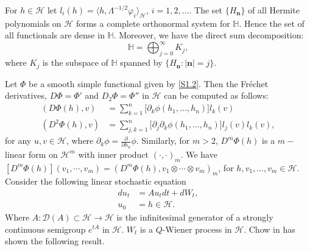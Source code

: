 \documentclass[review, onefignum, onetabnum]{siamart171218}
\begin{document}
\begin{lemma}\label{s1.le1}
     For $h\in\mathcal{H}  $ let $l_i(h)=\langle h,  \Lambda^{-1/2}\varphi_i
    \rangle_\mathcal{H}$, $ i=1,2,\ldots$. The set $\{H_{\bm{n}}\}$ of all
    Hermite polynomials on $\mathcal{H} $ forms a complete orthonormal system
    for $\mathbb{H} $. Hence the set of all functionals are dense in
    $\mathbb{H}$. Moreover, we have the direct sum decomposition:
     \[
        \mathbb{H} = \bigoplus_{j=0}^\infty K_j,
    \]
    where $K_j$ is the subspace of $\mathbb{H} $ spanned by $\{H_{\bm{n}}:
    |\bm{n}|=j\}$.

\end{lemma}
%
Let $\Phi$ be a smooth simple functional given by \eqref{S1.2}. Then the
Fr\'echet derivatives, $D \Phi = \Phi'$ and $D_2 \Phi = \Phi''$ in
$\mathcal{H}$ can be computed as follows:
\begin{equation}
    \label{s1.3}
    \begin{aligned}
        (D \Phi(h), v)
        &=
            \sum_{k=1}^n \big[\partial_k \phi(h_1,\ldots,h_n)\big]
            l_k(v)\nonumber
        \\
        (D^2 \Phi(h), v)
        &=
            \sum_{j,k=1}^n \big[\partial_j\partial_k
            \phi(h_1,\ldots,h_n)\big] l_j(v) l_k(v),
    \end{aligned}
\end{equation}
for any $u, v \in \mathcal{H}$, where
$\partial_k \phi= \frac{\partial}{\partial h_k} \phi$.
Similarly, for $m > 2$, $D^m \Phi(h)$ is a $m-$linear form on $\mathcal{H}^m$
with inner product $(\cdot,\cdot)_m$.
We have
$
%
    [D^m\Phi(h) ](v_1 , \cdots, v_m )
        = (D^m \Phi(h), v_1 \otimes \cdots \otimes v_m )_m
%
$,
for $h, v_1 , \ldots , v_m \in \mathcal{H}$.
Consider the following linear stochastic equation
\begin{align*}
    du_t&=Au_tdt+dW_t,\label{OU}\\
    u_0&=h\in \mathcal{H}.
\end{align*}
Where $A: \mathcal{D}(A) \subset \mathcal{H} \rightarrow \mathcal{H}$ is the
infinitesimal generator of a strongly continuous semigroup $e^{tA}$ in
$\mathcal{H}$. $W_t$ is a $Q$-Wiener process
in $\mathcal{H}$. Chow in \cite[Lemma 9.4.1]{liu} has shown the following
result.
\end{document}
